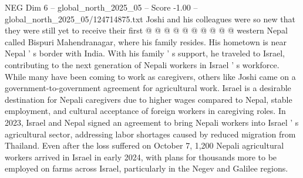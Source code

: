 \begin{textsample}{NEG Dim 6 – global\_north\_2025\_05 – Score -1.00 – global\_north\_2025\_05/124714875.txt}
Joshi and his colleagues were so new that they were still yet to receive their first @ @ @ @ @ @ @ @ @ @ western Nepal called Bispuri Mahendranagar, where his family resides.
His hometown is near Nepal ' s border with India.
With his family ' s support, he traveled to Israel, contributing to the next generation of Nepali workers in Israel ' s workforce.
While many have been coming to work as caregivers, others like Joshi came on a government-to-government agreement for agricultural work.
Israel is a desirable destination for Nepali caregivers due to higher wages compared to Nepal, stable employment, and cultural acceptance of foreign workers in caregiving roles.
In 2023, Israel and Nepal signed an agreement to bring Nepali workers into Israel ' s agricultural sector, addressing labor shortages caused by reduced migration from Thailand.
Even after the loss suffered on October 7, 1,200 Nepali agricultural workers arrived in Israel in early 2024, with plans for thousands more to be employed on farms across Israel, particularly in the Negev and Galilee regions.

\end{textsample}
